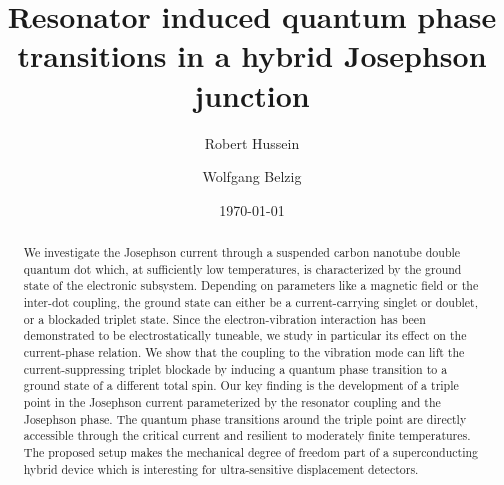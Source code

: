 \documentclass[aps,prb,twocolumn,superscriptaddress,amsmath,amssymb,longbibliography]{revtex4-1}
\begin{document}
	\title{Resonator induced quantum phase transitions in a hybrid Josephson junction}
	
	\author{Robert Hussein}
	\author{Wolfgang Belzig}
	\date{\today}
	
	\begin{abstract}
		We investigate the Josephson current through a suspended carbon nanotube double quantum dot which, at sufficiently low 
		temperatures, is characterized by the ground state of the electronic subsystem. Depending on parameters like a magnetic 
		field or the inter-dot coupling, the ground state can either be a current-carrying singlet or doublet, or a blockaded triplet state.
		Since the electron-vibration interaction has been demonstrated to be electrostatically tuneable, we study in particular its effect 
		on the current-phase relation. We show that the coupling to the vibration mode can lift the current-suppressing triplet blockade 
		by inducing a quantum phase transition to a ground state of a different total spin. Our key finding is the development of a triple 
		point in the Josephson current parameterized by the resonator coupling and the Josephson phase. The quantum phase transitions 
		around the triple point are directly accessible through the critical current and resilient to moderately finite temperatures. The 
		proposed setup makes the mechanical degree of freedom part of a superconducting hybrid device which is interesting 
		for ultra-sensitive displacement detectors.
	\end{abstract}
	
	\maketitle
	
\end{document}
